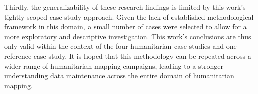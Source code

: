 Thirdly, the generalizability of these research findings is limited by this work's tightly-scoped case study approach. Given the lack of established methodological framework in this domain, a small number of cases were selected to allow for a more exploratory and descriptive investigation. This work's conclusions are thus only valid within the context of the four humanitarian case studies and one reference case study. It is hoped that this methodology can be repeated across a wider range of humanitarian mapping campaigns, leading to a stronger understanding data maintenance across the entire domain of humanitarian mapping. 



